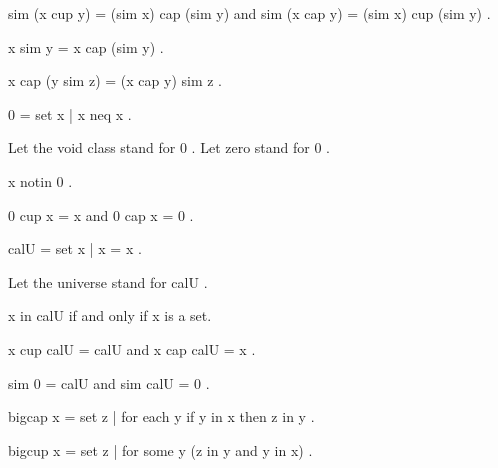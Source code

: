 \documentclass[a4paper,draft]{amsproc}
\begin{document}
\begin{forthel}
\begin{theorem}
 sim (x cup y) = (sim x) cap (sim y)  
and  sim (x cap y) = (sim x) cup (sim y) .
\end{theorem}

\begin{definition}  x sim y = x cap (sim y) .\end{definition}

\begin{theorem}
 x cap (y sim z) = (x cap y) sim z .
\end{theorem}

\begin{definition}  0 = { set  x | x neq x} .\end{definition}
Let the void class stand for  0 .
Let zero stand for  0 .

\begin{theorem}
 x notin 0 .
\end{theorem}

\begin{theorem}
 0 cup x = x  and  0 cap x = 0 .
\end{theorem}

\begin{definition}
	 cal{U} = { set  x | x = x} .
\end{definition}
Let the universe stand for  cal{U} .

\begin{theorem}
 x in cal{U}  if and only if  x  is a set.
\end{theorem}

\begin{theorem}
 x cup cal{U} = cal{U}  and  x cap cal{U} = x .
\end{theorem}

\begin{theorem}
 sim 0 = cal{U}  and  sim cal{U} = 0 .
\end{theorem}

\begin{definition}  bigcap x = 
{ set  z |  for each  y  if  y in x  then  z in y} .\end{definition}

\begin{definition}  bigcup x = 
{ set  z |  for some  y   (z in y  and  y in x)} .\end{definition}


\end{forthel}
\end{document}
